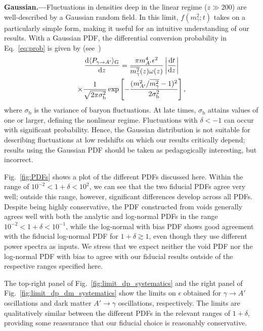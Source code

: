 \documentclass[prd,aps,10pt,nofootinbib,twocolumn,superscriptaddress,preprintnumbers,balancelastpage,longbibliography]{revtex4-1}
\begin{document}
\noindent
{\bf Gaussian.---}Fluctuations in densities deep in the linear regime ($z \gg 200$) are well-described by a Gaussian random field. In this limit, $f(m_\gamma^2;t)$ takes on a particularly simple form, making it useful for an intuitive understanding of our results. With a Gaussian PDF, the differential conversion probability in Eq.~\eqref{eq:prob} is given by (see~)
% 
\begin{multline}
    \frac{\mathrm{d} \langle P_{\gamma \to A'} \rangle_\text{G}}{\mathrm{d} z} = \frac{\pi m_{A^\prime}^4 \epsilon^2}{\overline{m_\gamma^2}(z) \omega(z)} \left|\frac{\mathrm{d} t}{\mathrm{d} z}\right| \\
    \times \frac{1}{\sqrt{2\pi \sigma_\text{b}^2}} \exp \left[- \frac{( m_{A^\prime}^2 / \overline{m_\gamma^2} - 1 )^2}{2 \sigma_\text{b}^2}\right],
    \label{eq:dP_dz}
\end{multline}    
%
where $\sigma_\text{b}$ is the variance of baryon fluctuations. At late times, $\sigma_\text{b}$ attains values of one or larger, defining the nonlinear regime. Fluctuations with $\delta < -1$ can occur with significant probability. Hence, the Gaussian distribution is not suitable for describing fluctuations at low redshifts on which our results critically depend; results using the Gaussian PDF should be taken as pedagogically interesting, but incorrect.

Fig.~\ref{fig:PDFs} shows a plot of the different PDFs discussed here. Within the range of $10^{-2} < 1 + \delta < 10^2$, we can see that the two fiducial PDFs agree very well; outside this range, however, significant differences develop across all PDFs. Despite being highly conservative, the PDF constructed from voids generally agrees well with both the analytic and log-normal PDFs in the range $10^{-2} < 1 + \delta < 10^{-1}$, while the log-normal with bias PDF shows good agreement with the fiducial log-normal PDF for $1 + \delta \gtrsim 1$, even though they use different power spectra as inputs. We stress that we expect neither the void PDF nor the log-normal PDF with bias to agree with our fiducial results outside of the respective ranges specified here. 

The top-right panel of Fig.~\ref{fig:limit_dp_systematics} and the right panel of Fig.~\ref{fig:limit_dp_dm_systematics} show the limits on $\epsilon$ obtained for $\gamma \to A'$ oscillations and dark matter $A' \to \gamma$ oscillations, respectively. The limits are qualitatively similar between the different PDFs in the relevant ranges of $1+\delta$, providing some reassurance that our fiducial choice is reasonably conservative. 
\end{document}
